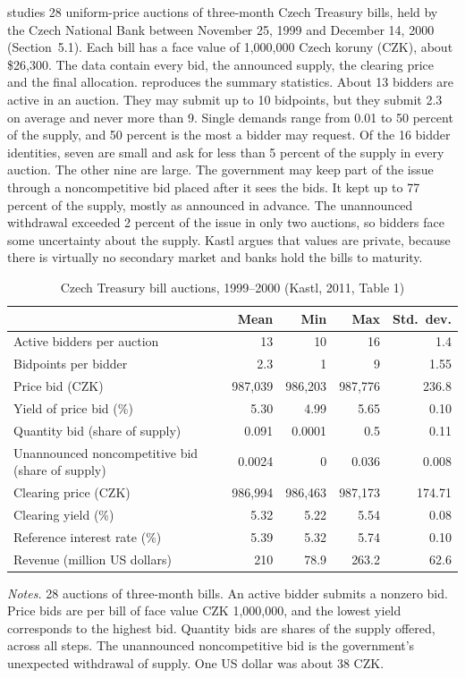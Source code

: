  \citet{Kastl2011} studies 28 uniform-price auctions of three-month Czech Treasury bills, held
by the Czech National Bank between November 25, 1999 and December 14, 2000 (Section~5.1). Each bill has a
face value of 1,000,000 Czech koruny (CZK), about \$26,300. The data contain every bid, the announced supply, the clearing
price and the final allocation.  reproduces the summary statistics. About 13 bidders
are active in an auction. They may submit up to 10 bidpoints, but they submit 2.3 on average and never more
than 9. Single demands range from 0.01 to 50 percent of the supply, and 50 percent is the most a bidder may
request. Of the 16 bidder identities, seven are small and ask for less than 5 percent of the supply in every
auction. The other nine are large. The government may keep part of the issue through a noncompetitive bid
placed after it sees the bids. It kept up to 77 percent of the supply, mostly as announced in advance. The
unannounced withdrawal exceeded 2 percent of the issue in only two auctions, so bidders face some uncertainty
about the supply. Kastl argues that values are private, because there is virtually no secondary market and banks
hold the bills to maturity.

\begin{table}[htbp]
\centering
\caption{Czech Treasury bill auctions, 1999--2000 (Kastl, 2011, Table 1)}
\label{tab:15-kastl-data}
\small
\begin{tabular}{lrrrr}
\toprule
 & Mean & Min & Max & Std.\ dev.\\
\midrule
Active bidders per auction & 13 & 10 & 16 & 1.4\\
Bidpoints per bidder & 2.3 & 1 & 9 & 1.55\\
Price bid (CZK) & 987,039 & 986,203 & 987,776 & 236.8\\
Yield of price bid (\%) & 5.30 & 4.99 & 5.65 & 0.10\\
Quantity bid (share of supply) & 0.091 & 0.0001 & 0.5 & 0.11\\
Unannounced noncompetitive bid (share of supply) & 0.0024 & 0 & 0.036 & 0.008\\
Clearing price (CZK) & 986,994 & 986,463 & 987,173 & 174.71\\
Clearing yield (\%) & 5.32 & 5.22 & 5.54 & 0.08\\
Reference interest rate (\%) & 5.39 & 5.32 & 5.74 & 0.10\\
Revenue (million US dollars) & 210 & 78.9 & 263.2 & 62.6\\
\bottomrule
\end{tabular}

\smallskip
\begin{minipage}{0.93\textwidth}
\footnotesize \textit{Notes.} 28 auctions of three-month bills. An active bidder submits a nonzero bid. Price
bids are per bill of face value CZK 1,000,000, and the lowest yield corresponds to the highest bid. Quantity
bids are shares of the supply offered, across all steps. The unannounced noncompetitive bid is the
government's unexpected withdrawal of supply. One US dollar was about 38 CZK.
\end{minipage}
\end{table}

